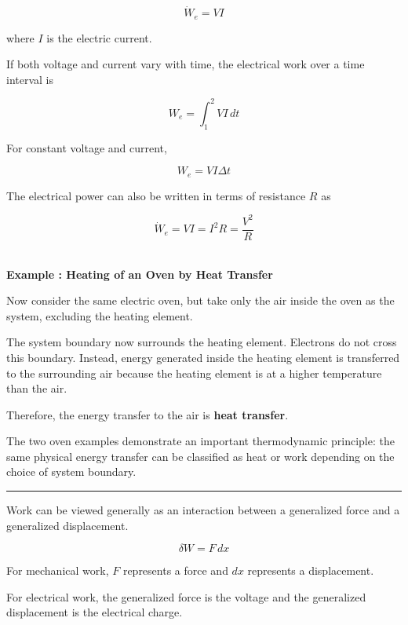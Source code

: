 \documentclass[12pt]{article}
\newcommand{\mysubsection}[2]{%
    \vspace{5px}
    \noindent{\headingfont\large #1\space #2\par}
    \vspace{4pt}
    \hrule
    \vspace{15pt}
}
\begin{document}
\begin{equation*}
\dot{W}_e=VI
\end{equation*}

where $I$ is the electric current.

If both voltage and current vary with time, the electrical work over a time interval is

\begin{equation*}
W_e=\int_1^2 VI\,dt
\end{equation*}

For constant voltage and current,

\begin{equation*}
W_e=VI\Delta t
\end{equation*}

The electrical power can also be written in terms of resistance $R$ as

\begin{equation*}
\dot{W}_e
=
VI
=
I^2R
=
\frac{V^2}{R}
\end{equation*}



\textbf{\\ Example : Heating of an Oven by Heat Transfer}

Now consider the same electric oven, but take only the air inside the oven as the system, excluding the heating element.

The system boundary now surrounds the heating element. Electrons do not cross this boundary. Instead, energy generated inside the heating element is transferred to the surrounding air because the heating element is at a higher temperature than the air.

Therefore, the energy transfer to the air is \textbf{heat transfer}.

The two oven examples demonstrate an important thermodynamic principle: the same physical energy transfer can be classified as heat or work depending on the choice of system boundary. 

\mysubsection{}{Generalized Work}

Work can be viewed generally as an interaction between a generalized force and a generalized displacement.

\begin{equation*}
\delta W = F\,dx
\end{equation*}

For mechanical work, $F$ represents a force and $dx$ represents a displacement.

For electrical work, the generalized force is the voltage and the generalized displacement is the electrical charge.
\end{document}
